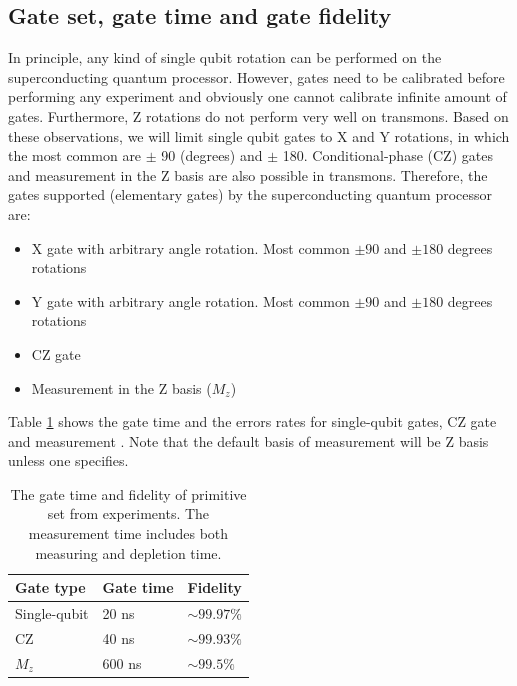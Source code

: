 

\newpage

\subsection*{Gate set, gate time and gate fidelity}
\label{sec:orgd576c64}


In principle, any kind of single qubit rotation can be performed on the superconducting quantum processor. However, gates need to be calibrated before performing any experiment and obviously one cannot calibrate infinite amount of gates. Furthermore, Z rotations do not perform very well on transmons. Based on these observations, we will limit single qubit gates to X and Y rotations, in which the most common are  $\pm$ 90 (degrees) and $\pm$ 180. Conditional-phase (CZ) gates and measurement in the Z basis are also possible in transmons. Therefore, the gates supported (elementary gates) by the superconducting quantum processor are:

\begin{itemize}
\item X gate with arbitrary angle rotation. Most common  \(\pm 90\) and \(\pm180\) degrees rotations
\item Y gate with arbitrary angle rotation. Most common  \(\pm 90\) and \(\pm180\) degrees rotations
\item CZ gate 
\item Measurement in the Z basis ($M_{z}$)
\end{itemize}

Table \ref{primitive_gate_time} shows the gate time and the errors rates for single-qubit gates, CZ gate and measurement \cite{versluis2016scalable}. Note that the default basis of measurement will be Z basis unless one specifies.

\begin{table}[h!]
\centering
\caption{The gate time and fidelity of primitive set from experiments. The measurement time includes both measuring and depletion time.}
\label{primitive_gate_time}
\begin{tabular}{lll}
\textbf{Gate type}    & \textbf{Gate time} & \textbf{Fidelity}       \\
\hline\hline
Single-qubit & 20 ns     &  $\sim 99.97 \%$ \\
\hline

CZ           & 40 ns     & $\sim 99.93 \%$           \\
\hline
$M_{z}$  & 600 ns    & $\sim 99.5 \%$     \\  
\hline
\end{tabular}
\end{table}

